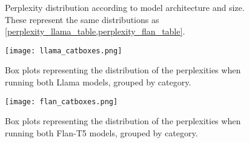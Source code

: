 \begin{figure}[H]
	\centering
	\caption{Perplexity distribution according to model architecture and size. These represent the same distributions as \cref{perplexity_llama_table,perplexity_flan_table}.}
	\label{perplexity_results}
\end{figure}

\begin{figure}[p]
	\texttt{[image: llama\_catboxes.png]}
	\caption{Box plots representing the distribution of the perplexities when running both Llama models, grouped by category.}
\end{figure}

\begin{figure}[p]
	\texttt{[image: flan\_catboxes.png]}
	\caption{Box plots representing the distribution of the perplexities when running both Flan-T5 models, grouped by category.}
\end{figure}
